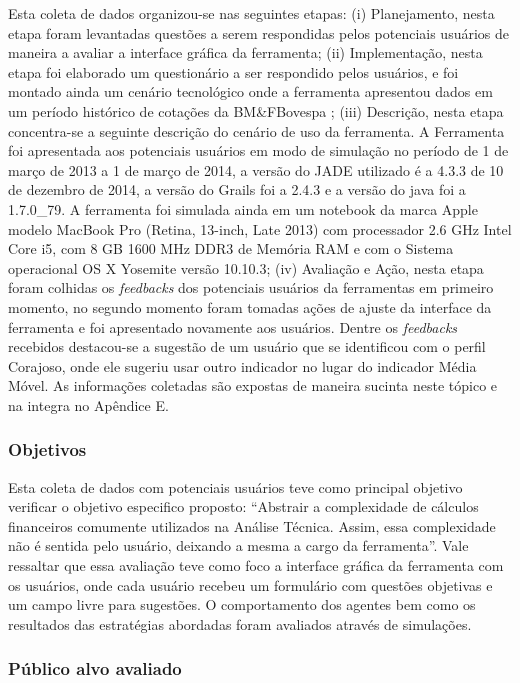 Esta coleta de dados organizou-se nas seguintes etapas: (i) Planejamento, nesta etapa foram levantadas questões a serem respondidas pelos potenciais usuários de maneira a avaliar a interface gráfica da ferramenta; (ii) Implementação, nesta etapa foi elaborado um questionário a ser respondido pelos usuários, e foi montado ainda um cenário tecnológico onde a ferramenta apresentou dados em um período histórico de cotações da BM\&FBovespa ; (iii) Descrição, nesta etapa concentra-se a seguinte descrição do cenário de uso da ferramenta. A Ferramenta foi apresentada aos potenciais usuários em modo de simulação no período de 1 de março de 2013 a 1 de março de 2014, a versão do JADE utilizado é a 4.3.3 de 10 de dezembro de 2014, a versão do Grails foi a 2.4.3 e a versão do java foi a 1.7.0\_79. A ferramenta foi simulada ainda em um notebook da marca Apple modelo MacBook Pro (Retina, 13-inch, Late 2013) com processador 2.6 GHz Intel Core i5, com 8 GB 1600 MHz DDR3 de Memória RAM e com o Sistema operacional OS X Yosemite versão 10.10.3; (iv) Avaliação e Ação, nesta etapa foram colhidas os \textit{feedbacks} dos potenciais usuários da ferramentas em primeiro momento, no segundo momento foram tomadas ações de ajuste da interface da ferramenta e foi apresentado novamente aos usuários. Dentre os \textit{feedbacks} recebidos destacou-se a sugestão de um usuário que se identificou com o perfil Corajoso, onde ele sugeriu usar outro indicador no lugar do indicador Média Móvel. As informações coletadas são expostas de maneira sucinta neste tópico e na integra no Apêndice E.

\subsubsection{Objetivos}

Esta coleta de dados com potenciais usuários teve como principal objetivo verificar  o objetivo especifico proposto: “Abstrair a complexidade de cálculos financeiros comumente utilizados na Análise Técnica. Assim, essa complexidade não é sentida pelo usuário, deixando a mesma a cargo da ferramenta”. Vale ressaltar que essa avaliação teve como foco a interface gráfica da ferramenta com os usuários, onde cada usuário recebeu um formulário com questões objetivas e um campo livre para sugestões. O comportamento dos agentes bem como os resultados das estratégias abordadas foram avaliados através de simulações.

\subsubsection{Público alvo avaliado}

